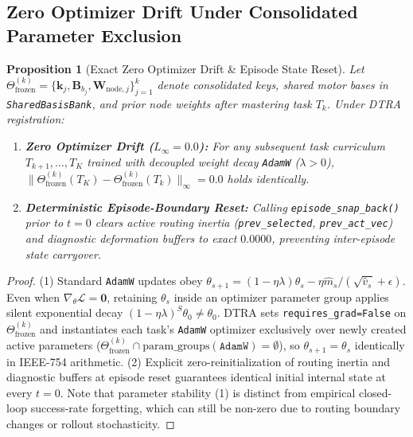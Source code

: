 \documentclass[10pt]{article}
\newtheorem{proposition}{Proposition}
\begin{document}
\subsection{Zero Optimizer Drift Under Consolidated Parameter Exclusion}
\begin{proposition}[Exact Zero Optimizer Drift \& Episode State Reset]
\label{prop:zero_drift}
Let $\Theta_{\text{frozen}}^{(k)} = \{\mathbf{k}_j, \mathbf{B}_{b_j}, \mathbf{W}_{\text{node},j}\}_{j=1}^{k}$ denote consolidated keys, shared motor bases in \texttt{SharedBasisBank}, and prior node weights after mastering task $T_k$. Under DTRA registration:
\begin{enumerate}[leftmargin=*,itemsep=2pt]
  \item \textbf{Zero Optimizer Drift ($L_\infty = 0.0$):} For any subsequent task curriculum $T_{k+1}, \dots, T_K$ trained with decoupled weight decay \texttt{AdamW} ($\lambda > 0$), $\|\Theta_{\text{frozen}}^{(k)}(T_K) - \Theta_{\text{frozen}}^{(k)}(T_k)\|_\infty = 0.0$ holds identically.
  \item \textbf{Deterministic Episode-Boundary Reset:} Calling \texttt{episode\_snap\_back()} prior to $t=0$ clears active routing inertia (\texttt{prev\_selected}, \texttt{prev\_act\_vec}) and diagnostic deformation buffers to exact $0.0000$, preventing inter-episode state carryover.
\end{enumerate}
\end{proposition}

\begin{proof}
(1) Standard \texttt{AdamW} updates obey $\theta_{s+1} = (1 - \eta\lambda)\theta_s - \eta \hat{m}_s / (\sqrt{\hat{v}_s} + \epsilon)$. Even when $\nabla_\theta\mathcal{L} = \mathbf{0}$, retaining $\theta_s$ inside an optimizer parameter group applies silent exponential decay $(1 - \eta\lambda)^S \theta_0 \neq \theta_0$. DTRA sets \texttt{requires\_grad=False} on $\Theta_{\text{frozen}}^{(k)}$ and instantiates each task's \texttt{AdamW} optimizer exclusively over newly created active parameters ($\Theta_{\text{frozen}}^{(k)} \cap \text{param\_groups}(\texttt{AdamW}) = \emptyset$), so $\theta_{s+1} = \theta_s$ identically in IEEE-754 arithmetic. (2) Explicit zero-reinitialization of routing inertia and diagnostic buffers at episode reset guarantees identical initial internal state at every $t=0$. Note that parameter stability (1) is distinct from empirical closed-loop success-rate forgetting, which can still be non-zero due to routing boundary changes or rollout stochasticity.
\end{proof}
\end{document}
